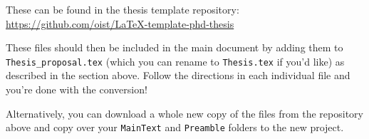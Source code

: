 These can be found in the thesis template repository:
\url{https://github.com/oist/LaTeX-template-phd-thesis}

These files should then be included in the main document by adding them
to \texttt{Thesis\_proposal.tex} (which you can rename to \texttt{Thesis.tex}
if you'd like) as described in the section above. Follow the directions
in each individual file and you're done with the conversion!

Alternatively, you can download a whole new copy of the files from the
repository above and copy over your \texttt{MainText} and \texttt{Preamble}
folders to the new project.
